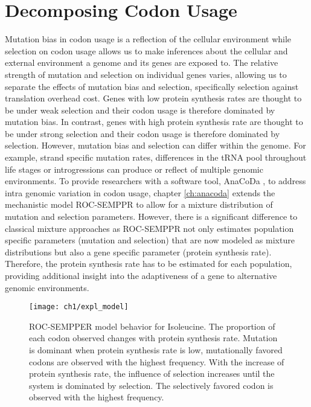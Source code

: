 \section{Decomposing Codon Usage}

Mutation bias in codon usage is a reflection of the cellular environment while selection on codon usage allows us to make inferences about the cellular and external environment a genome and its genes are exposed to.
The relative strength of mutation and selection on individual genes varies, allowing us to separate the effects of mutation bias and selection, specifically selection against translation overhead cost.
Genes with low protein synthesis rates are thought to be under weak selection and their codon usage is therefore dominated by mutation bias.
In contrast, genes with high protein synthesis rate are thought to be under strong selection and their codon usage is therefore dominated by selection.
However, mutation bias and selection can differ within the genome.
For example, strand specific mutation rates, differences in the tRNA pool throughout life stages or introgressions can produce or reflect of multiple genomic environments.
To provide researchers with a software tool, AnaCoDa \cite{landerer2018}, to address intra genomic variation in codon usage, chapter \ref{ch:anacoda} extends the mechanistic model ROC-SEMPPR \cite{gilchrist2015} to allow for a mixture distribution of mutation and selection parameters.
However, there is a significant difference to classical mixture approaches as ROC-SEMPPR not only estimates population specific parameters (mutation and selection) that are now modeled as mixture distributions but also a gene specific parameter (protein synthesis rate). 
Therefore, the protein synthesis rate has to be estimated for each population, providing additional insight into the adaptiveness of a gene to alternative genomic environments.

\begin{figure}[H]
     \centering
	\texttt{[image: ch1/expl\_model]}
	\caption{ROC-SEMPPER model behavior for Isoleucine.
	The proportion of each codon observed changes with protein synthesis rate.
	Mutation is dominant when protein synthesis rate is low, mutationally favored codons are observed with the highest frequency.
	With the increase of protein synthesis rate, the influence of selection increases until the system is dominated by selection.
	The selectively favored codon is observed with the highest frequency.}
	\label{fig:expl_model}
\end{figure}

